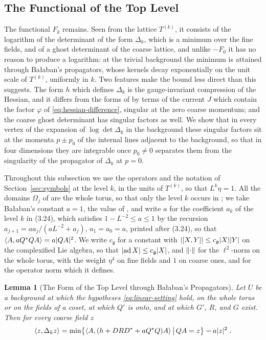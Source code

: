 \documentclass[11pt]{preprint}
\DeclarePairedDelimiter{\abs}{\lvert}{\rvert}
\DeclarePairedDelimiter{\norm}{\lVert}{\rVert}
\numberwithin{equation}{section}
\newtheorem{lemma}{Lemma}[section]
\theoremstyle{definition}
\theoremstyle{remark}
\theoremstyle{plain}
\begin{document}
\subsection{The Functional of the Top Level}\label{sec:top-level}

The functional $F_k$ remains. Seen from the lattice $T^{(k)}$, it consists of the logarithm of the determinant of the form $\Delta_k$, which is a minimum over the fine fields, and of a ghost determinant of the coarse lattice, and unlike $-F_0$ it has no reason to produce a logarithm: at the trivial background the minimum is attained through Ba{\l}aban's propagators, whose kernels decay exponentially on the unit scale of $T^{(k)}$, uniformly in $k$. Two features make the bound less direct than this suggests. The form $h$ which defines $\Delta_k$ is the gauge-invariant compression of the Hessian, and it differs from the forms of \cite{BalabanPBG} by terms of the current $J$ which contain the factor $\varphi$ of \eqref{eq:hessian-difference}, singular at the zero coarse momentum; and the coarse ghost determinant has singular factors as well. We show that in every vertex of the expansion of $\log\det\Delta_k$ in the background these singular factors sit at the momenta $p \pm p_0$ of the internal lines adjacent to the background, so that in four dimensions they are integrable once $p_0 \neq 0$ separates them from the singularity of the propagator of $\Delta_k$ at $p = 0$.

Throughout this subsection we use the operators and the notation of Section~\ref{sec:symbols} at the level $k$, in the units of $T^{(k)}$, so that $L^k\eta = 1$. All the domains $\Omega_j$ of \cite{BalabanPBG} are the whole torus, so that only the level $k$ occurs in \cite[(3.24), p.~394]{BalabanPBG}; we take Ba{\l}aban's constant $a = 1$, the value of \cite[Theorem~3.3, p.~399]{BalabanPBG}, and write $a$ for the coefficient $a_k$ of the level $k$ in (3.24), which satisfies $1 - L^{-2} \leq a \leq 1$ by the recursion $a_{j+1} = aa_j/(aL^{-2} + a_j)$, $a_1 = a_0 = a$, printed after (3.24), so that $\langle A, aQ^*QA \rangle = a\abs{QA}^2$. We write $c_{\mathfrak g}$ for a constant with $\abs{[X, Y]} \leq c_{\mathfrak g}\abs{X}\abs{Y}$ on the complexified Lie algebra, so that $\abs{\operatorname{ad}X} \leq c_{\mathfrak g}\abs{X}$, and $\norm{\cdot}$ for the $\ell^2$-norm on the whole torus, with the weight $\eta^4$ on fine fields and $1$ on coarse ones, and for the operator norm which it defines.

\begin{lemma}[The Form of the Top Level through Ba{\l}aban's Propagators]\label{lem:top-representation}
Let $U$ be a background at which the hypotheses \eqref{eq:linear-setting} hold, on the whole torus or on the fields of a coset, at which $Q'$ is onto, and at which $G'$, $R$, and $G$ exist. Then for every coarse field $z$
\begin{equation}\label{eq:top-representation}
    \langle z, \Delta_kz \rangle = \min\bigl\{ \langle A, (h + DRD^* + aQ^*Q)A \rangle \, \big| \, QA = z \bigr\} - a\abs{z}^2\;.
\end{equation}
\end{lemma}
\end{document}

